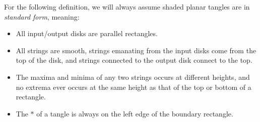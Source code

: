 \documentclass[11pt]{article}
\theoremstyle{plain}
\theoremstyle{definition}
\begin{document}
For the following definition, we will always assume shaded planar tangles are in \textit{standard form}, meaning:
\begin{itemize}
\item All input/output disks are parallel rectangles.
\item All strings are smooth, strings emanating from the input disks come from the top of the disk, and strings connected to the output disk connect to the top.
\item The maxima and minima of any two strings occurs at different heights, and no extrema ever occurs at the same height as that of the top or bottom of a rectangle.
\item The $\ast$ of a tangle is always on the left edge of the boundary rectangle.
\end{itemize}
\end{document}
